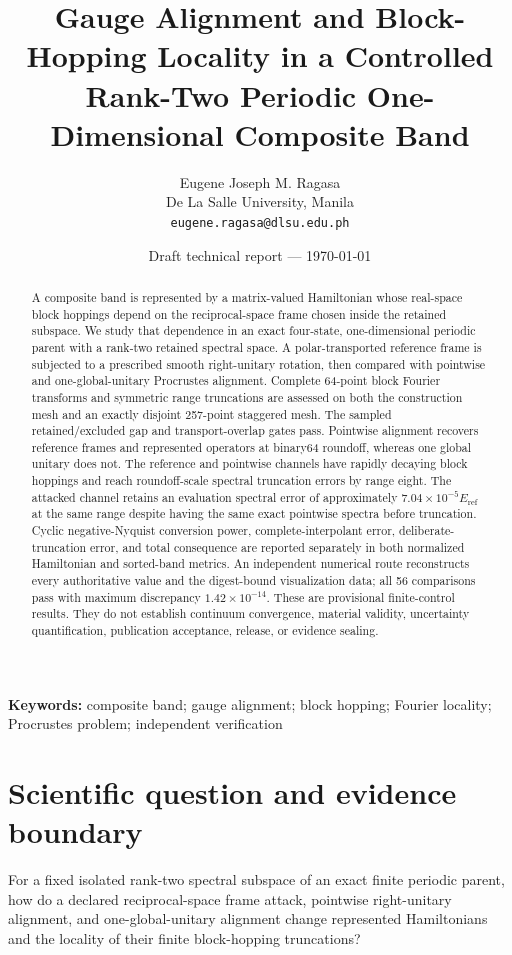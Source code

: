 \documentclass[11pt]{article}
\title{Gauge Alignment and Block-Hopping Locality in a Controlled\\
Rank-Two Periodic One-Dimensional Composite Band}
\author{Eugene Joseph M. Ragasa\\
De La Salle University, Manila\\
\texttt{eugene.ragasa@dlsu.edu.ph}}
\date{Draft technical report --- \today}
\newcommand{\eref}{E_{\mathrm{ref}}}
\begin{document}
\maketitle

\begin{abstract}
A composite band is represented by a matrix-valued Hamiltonian whose real-space block
hoppings depend on the reciprocal-space frame chosen inside the retained subspace.  We
study that dependence in an exact four-state, one-dimensional periodic parent with a
rank-two retained spectral space.  A polar-transported reference frame is subjected to
a prescribed smooth right-unitary rotation, then compared with pointwise and
one-global-unitary Procrustes alignment.  Complete 64-point block Fourier transforms
and symmetric range truncations are assessed on both the construction mesh and an
exactly disjoint 257-point staggered mesh.  The sampled retained/excluded gap and
transport-overlap gates pass.  Pointwise alignment recovers reference frames and
represented operators at binary64 roundoff, whereas one global unitary does not.  The
reference and pointwise channels have rapidly decaying block hoppings and reach
roundoff-scale spectral truncation errors by range eight.  The attacked channel retains
an evaluation spectral error of approximately $7.04\times10^{-5}\eref$ at the same
range despite having the same exact pointwise spectra before truncation.  Cyclic
negative-Nyquist conversion power, complete-interpolant error, deliberate-truncation
error, and total consequence are reported separately in both normalized Hamiltonian and
sorted-band metrics.  An independent numerical route reconstructs every authoritative
value and the digest-bound visualization data; all 56 comparisons pass with maximum
discrepancy $1.42\times10^{-14}$.  These are provisional finite-control results.  They do not
establish continuum convergence, material validity, uncertainty quantification,
publication acceptance, release, or evidence sealing.
\end{abstract}

\noindent\textbf{Keywords:} composite band; gauge alignment; block hopping; Fourier
locality; Procrustes problem; independent verification

\section{Scientific question and evidence boundary}

For a fixed isolated rank-two spectral subspace of an exact finite periodic parent,
how do a declared reciprocal-space frame attack, pointwise right-unitary alignment,
and one-global-unitary alignment change represented Hamiltonians and the locality of
their finite block-hopping truncations?
\end{document}
